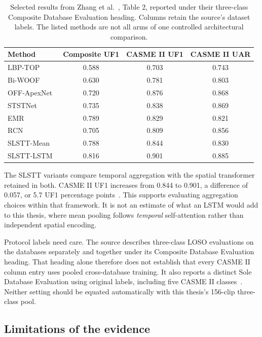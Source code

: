 \begin{table}[htbp]
    \centering
    \small
    \begin{tabular}{@{}lccc@{}}
        \hline
        \textbf{Method} & \textbf{Composite UF1} & \textbf{CASME II UF1} & \textbf{CASME II UAR} \\
        \hline
        LBP-TOP & 0.588 & 0.703 & 0.743 \\
        Bi-WOOF & 0.630 & 0.781 & 0.803 \\
        OFF-ApexNet~\cite{liong2019a} & 0.720 & 0.876 & 0.868 \\
        STSTNet~\cite{liong2019b} & 0.735 & 0.838 & 0.869 \\
        EMR~\cite{liu2019} & 0.789 & 0.829 & 0.821 \\
        RCN~\cite{xia2020b} & 0.705 & 0.809 & 0.856 \\
        SLSTT-Mean & 0.788 & 0.844 & 0.830 \\
        SLSTT-LSTM & 0.816 & 0.901 & 0.885 \\
        \hline
    \end{tabular}
    \caption[SLSTT and comparison results]{Selected results from Zhang et al.~\cite{zhang2022}, Table 2, reported under their three-class Composite Database Evaluation heading. Columns retain the source's dataset labels. The listed methods are not all arms of one controlled architectural comparison.}
    \label{tab:slstt-results}
\end{table}

The SLSTT variants compare temporal aggregation with the spatial transformer retained in both. CASME II UF1 increases from 0.844 to 0.901, a difference of 0.057, or 5.7 UF1 percentage points~\cite{zhang2022}. This supports evaluating aggregation choices within that framework. It is not an estimate of what an LSTM would add to this thesis, where mean pooling follows \emph{temporal} self-attention rather than independent spatial encoding.

Protocol labels need care. The source describes three-class LOSO evaluations on the databases separately and together under its Composite Database Evaluation heading. That heading alone therefore does not establish that every CASME II column entry uses pooled cross-database training. It also reports a distinct Sole Database Evaluation using original labels, including five CASME II classes~\cite{zhang2022}. Neither setting should be equated automatically with this thesis's 156-clip three-class pool.

\subsection{Limitations of the evidence}
\label{sec:transformer-limitations}

